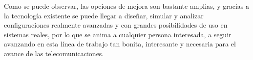 \par Como se puede observar, las opciones de mejora son bastante amplias, y gracias a la tecnología existente se puede llegar a diseñar, simular y analizar configuraciones realmente avanzadas y con grandes posibilidades de uso en sistemas reales, por lo que se anima a cualquier persona interesada, a seguir avanzando en esta línea de trabajo tan bonita, interesante y necesaria para el avance de las telecomunicaciones.


